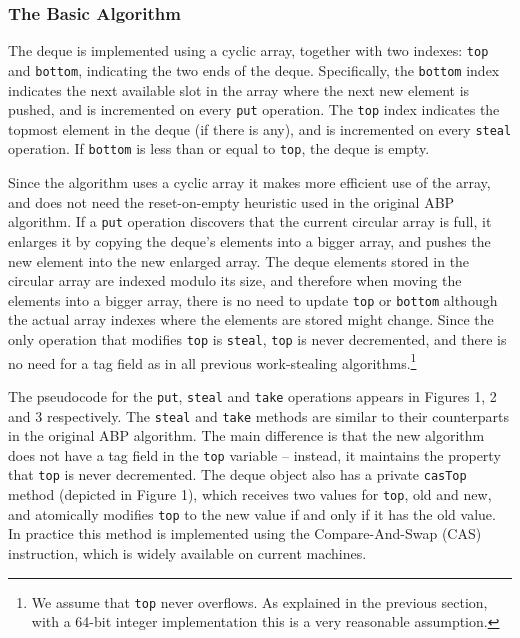 \subsubsection{The Basic Algorithm}


The deque is implemented using a cyclic array, together with two
indexes: \lstinline!top! and \lstinline!bottom!, indicating the two
ends of the deque. Specifically, the \lstinline!bottom! index
indicates the next available slot in the array where the next new
element is pushed, and is incremented on every \lstinline!put!
operation. The \lstinline!top! index indicates the topmost element in
the deque (if there is any), and is incremented on every
\lstinline!steal! operation. If \lstinline!bottom! is less than or
equal to \lstinline!top!, the deque is empty.

Since the algorithm uses a cyclic array it makes more efficient use of
the array, and does not need the reset-on-empty heuristic used in the
original ABP algorithm. If a \lstinline!put! operation discovers that
the current circular array is full, it enlarges it by copying the
deque's elements into a bigger array, and pushes the new element into
the new enlarged array. The deque elements stored in the circular
array are indexed modulo its size, and therefore when moving the
elements into a bigger array, there is no need to update
\lstinline!top! or \lstinline!bottom! although the actual array
indexes where the elements are stored might change. Since the only
operation that modifies \lstinline!top! is \lstinline!steal!,
\lstinline!top! is never decremented, and there is no need for a tag
field as in all previous work-stealing algorithms.\footnote{We assume
  that \lstinline!top! never overflows. As explained in the previous
  section, with a 64-bit integer implementation this is a very
  reasonable assumption.}


The pseudocode for the \lstinline!put!, \lstinline!steal! and
\lstinline!take! operations appears in Figures 1, 2 and 3
respectively. The \lstinline!steal! and \lstinline!take! methods are
similar to their counterparts in the original ABP algorithm. The main
difference is that the new algorithm does not have a tag field in the
\lstinline!top! variable -- instead, it maintains the property that
\lstinline!top! is never decremented. The deque object also has a
private \lstinline!casTop! method (depicted in Figure 1), which
receives two values for \lstinline!top!, old and new, and atomically
modifies \lstinline!top! to the new value if and only if it has the
old value. In practice this method is implemented using the
Compare-And-Swap (CAS) instruction, which is widely available on
current machines.

